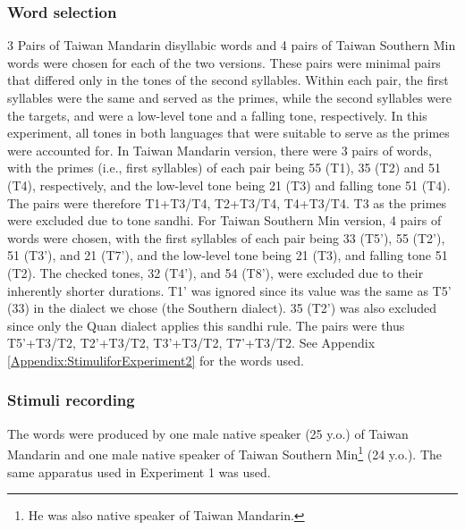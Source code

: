 \documentclass[12pt]{report}
\begin{document}
\begin{CJK}{UTF8}{bsmi}
\subsubsection{Word selection}
3 Pairs of Taiwan Mandarin disyllabic words and 4 pairs of Taiwan Southern Min words were chosen for each of the two versions. These pairs were minimal pairs that differed only in the tones of the second syllables. Within each pair, the first syllables were the same and served as the primes, while the second syllables were the targets, and were a low-level tone and a falling tone, respectively. In this experiment, all tones in both languages that were suitable to serve as the primes were accounted for. In Taiwan Mandarin version, there were 3 pairs of words, with the primes (i.e., first syllables) of each pair being 55 (T1), 35 (T2) and 51 (T4), respectively, and the low-level tone being 21 (T3) and falling tone 51 (T4). The pairs were therefore T1+T3/T4, T2+T3/T4, T4+T3/T4. T3 as the primes were excluded due to tone sandhi. For Taiwan Southern Min version, 4 pairs of words were chosen, with the first syllables of each pair being 33 (T5'), 55 (T2'), 51 (T3'), and 21 (T7'), and the low-level tone being 21 (T3), and falling tone 51 (T2). The checked tones, 32 (T4'), and 54 (T8'), were excluded due to their inherently shorter durations. T1' was ignored since its value was the same as T5' (33) in the dialect we chose (the Southern dialect). 35 (T2') was also excluded since only the Quan dialect applies this sandhi rule. The pairs were thus T5'+T3/T2, T2'+T3/T2, T3'+T3/T2, T7'+T3/T2. See Appendix \ref{Appendix:StimuliforExperiment2} for the words used.

\subsubsection{Stimuli recording}
The words were produced by one male native speaker (25 y.o.) of Taiwan Mandarin and one male native speaker of Taiwan Southern Min\footnote{He was also native speaker of Taiwan Mandarin.} (24 y.o.). The same apparatus used in Experiment 1 was used.


\end{CJK}
\end{document}
